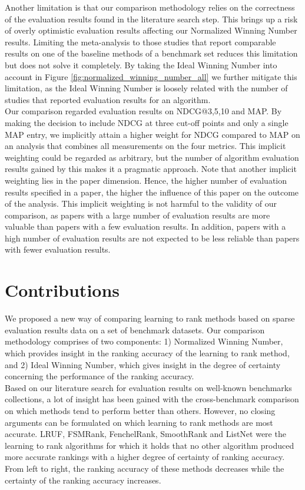 \documentclass{sig-alternate}
\begin{document}
Another limitation is that our comparison methodology relies on the correctness of the evaluation results found in the literature search step. This brings up a risk of overly optimistic evaluation results affecting our Normalized Winning Number results. Limiting the meta-analysis to those studies that report comparable results on one of the baseline methods of a benchmark set reduces this limitation but does not solve it completely. By taking the Ideal Winning Number into account in Figure \ref{fig:normalized_winning_number_all} we further mitigate this limitation, as the Ideal Winning Number is loosely related with the number of studies that reported evaluation results for an algorithm.\\

Our comparison regarded evaluation results on NDCG@{3,5,10} and MAP. By making the decision to include NDCG at three cut-off points and only a single MAP entry, we implicitly attain a higher weight for NDCG compared to MAP on an analysis that combines all measurements on the four metrics. This implicit weighting could be regarded as arbitrary, but the number of algorithm evaluation results gained by this makes it a pragmatic approach. Note that another implicit weighting lies in the paper dimension. Hence, the higher number of evaluation results specified in a paper, the higher the influence of this paper on the outcome of the analysis. This implicit weighting is not harmful to the validity of our comparison, as papers with a large number of evaluation results are more valuable than papers with a few evaluation results. In addition, papers with a high number of evaluation results are not expected to be less reliable than papers with fewer evaluation results.\\

\section{Contributions}
We proposed a new way of comparing learning to rank methods based on sparse evaluation results data on a set of benchmark datasets. Our comparison methodology comprises of two components: 1) Normalized Winning Number, which provides insight in the ranking accuracy of the learning to rank method, and 2) Ideal Winning Number, which gives insight in the degree of certainty concerning the performance of the ranking accuracy.\\

Based on our literature search for evaluation results on well-known benchmarks collections, a lot of insight has been gained with the cross-benchmark comparison on which methods tend to perform better than others. However, no closing arguments can be formulated on which learning to rank methods are most accurate. LRUF, FSMRank, FenchelRank, SmoothRank and ListNet were the learning to rank algorithms for which it holds that no other algorithm produced more accurate rankings with a higher degree of certainty of ranking accuracy. From left to right, the ranking accuracy of these methods decreases while the certainty of the ranking accuracy increases.\\
\end{document}
